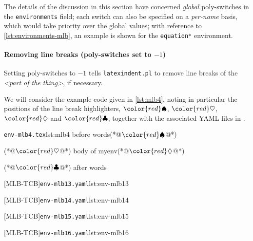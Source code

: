 \documentclass[10pt]{article}
\newcommand{\BeginStartsOnOwnLine}{\color{red}\spadesuit}
\newcommand{\BodyStartsOnOwnLine}{\color{red}\heartsuit}
\newcommand{\EndStartsOnOwnLine}{\color{red}\diamondsuit}
\newcommand{\EndFinishesWithLineBreak}{\color{red}\clubsuit}
\begin{document}
  The details of the discussion in this section have concerned \emph{global}
  poly-switches in the \texttt{environments} field; each switch can also be specified on
  a \emph{per-name} basis, which would take priority over the global values; with
  reference to \vref{lst:environments-mlb}, an example is shown for the
  \texttt{equation*} environment.

 \paragraph{Removing line breaks (poly-switches set to $-1$)}
  Setting poly-switches to $-1$ tells \texttt{latexindent.pl} to remove line breaks of
  the \emph{<part of the thing>}, if necessary.

  \begin{example}
  We will consider the example code given in \cref{lst:mlb4}, noting in particular the
  positions of the line break highlighters, $\BeginStartsOnOwnLine$,
  $\BodyStartsOnOwnLine$, $\EndStartsOnOwnLine$ and $\EndFinishesWithLineBreak$, together
  with the associated YAML files in .

  \begin{minipage}{.45\linewidth}
   \begin{cmhlistings}[style=tcblatex,escapeinside={(*@}{@*)}]{\texttt{env-mlb4.tex}}{lst:mlb4}
before words(*@$\BeginStartsOnOwnLine$@*)
\begin{myenv}(*@$\BodyStartsOnOwnLine$@*)
body of myenv(*@$\EndStartsOnOwnLine$@*)
\end{myenv}(*@$\EndFinishesWithLineBreak$@*)
after words
\end{cmhlistings}
  \end{minipage}%
  \hfill
  \begin{minipage}{.51\textwidth}
   [MLB-TCB]{\texttt{env-mlb13.yaml}}{lst:env-mlb13}

   [MLB-TCB]{\texttt{env-mlb14.yaml}}{lst:env-mlb14}

   [MLB-TCB]{\texttt{env-mlb15.yaml}}{lst:env-mlb15}

   [MLB-TCB]{\texttt{env-mlb16.yaml}}{lst:env-mlb16}
  \end{minipage}


\end{example}
\end{document}
